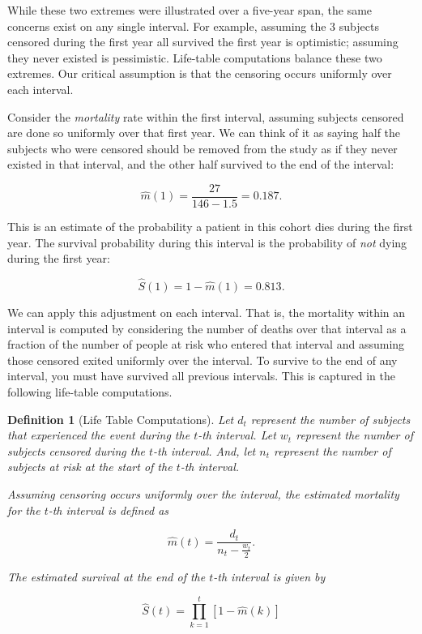 \documentclass[
]{book}
\theoremstyle{plain}
\theoremstyle{mydefn}
\newtheorem{definition}{Definition}[chapter]
\theoremstyle{myexmpl}
\theoremstyle{remark}
\begin{document}
While these two extremes were illustrated over a five-year span, the same concerns exist on any single interval. For example, assuming the 3 subjects censored during the first year all survived the first year is optimistic; assuming they never existed is pessimistic. Life-table computations balance these two extremes. Our critical assumption is that the censoring occurs uniformly over each interval.

Consider the \emph{mortality} rate within the first interval, assuming subjects censored are done so uniformly over that first year. We can think of it as saying half the subjects who were censored should be removed from the study as if they never existed in that interval, and the other half survived to the end of the interval:

\[\widehat{m}(1) = \frac{27}{146 - 1.5} = 0.187.\]

This is an estimate of the probability a patient in this cohort dies during the first year. The survival probability during this interval is the probability of \emph{not} dying during the first year:

\[\widehat{S}(1) = 1 - \widehat{m}(1) = 0.813.\]

We can apply this adjustment on each interval. That is, the mortality within an interval is computed by considering the number of deaths over that interval as a fraction of the number of people at risk who entered that interval and assuming those censored exited uniformly over the interval. To survive to the end of any interval, you must have survived all previous intervals. This is captured in the following life-table computations.

\begin{definition}[Life Table Computations]
\protect\hypertarget{def:defn-life-table-computations}{}{\label{def:defn-life-table-computations} {} }Let \(d_t\) represent the number of subjects that experienced the event during the \(t\)-th interval. Let \(w_t\) represent the number of subjects censored during the \(t\)-th interval. And, let \(n_{t}\) represent the number of subjects at risk at the start of the \(t\)-th interval.

Assuming censoring occurs uniformly over the interval, the estimated \emph{mortality} for the \(t\)-th interval is defined as

\[\widehat{m}(t) = \frac{d_t}{n_t - \frac{w_t}{2}}.\]

The estimated survival at the end of the \(t\)-th interval is given by

\[\widehat{S}(t) = \prod_{k=1}^{t} \left[1 - \widehat{m}(k)\right]\]
\end{definition}
\end{document}
